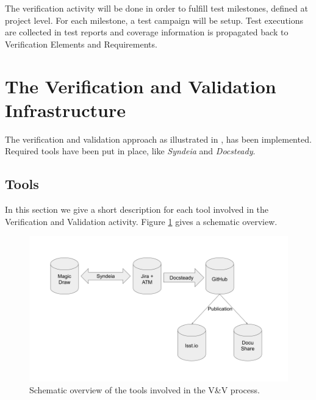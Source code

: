 The verification activity will be done in order to fulfill test milestones, defined at project level.
For each milestone, a test campaign will be setup. 
Test executions are collected in test reports and coverage information is propagated back to Verification Elements and Requirements.



\section{The Verification and Validation Infrastructure}

The verification and validation approach as illustrated in \cite{10.1117/12.2310125} , has been implemented.
Required tools have been put in place, like \textit{Syndeia} and \textit{Docsteady}.


\subsection{Tools}

In this section we give a short description for each tool involved in the Verification and Validation activity.
Figure \ref{fig:vandvtools} gives a schematic overview.

\begin{figure}
\begin{center}
\includegraphics[width=\textwidth]{imgs/VandVtools.png}
 \caption{Schematic overview of the tools involved in the V\&V process.}
 \label{fig:vandvtools}
\end{center}
\end{figure}

